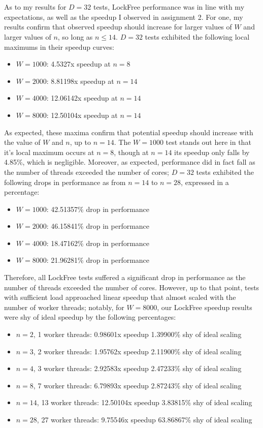 \documentclass[]{article}
\begin{document}
\\\\
As to my results for $D = 32$ tests, LockFree performance was in line with my expectations, as well as the speedup I observed in assignment 2. For one, my results confirm that observed speedup should increase for larger values of $W$ and larger values of $n$, so long as $n \leq 14$. $D = 32$ tests exhibited the following local maximums in their speedup curves:
\begin{itemize}
	\item$W = 1000$: 4.5327x speedup at $n = 8$
	\item$W = 2000$: 8.81198x speedup at $n = 14$
	\item$W = 4000$: 12.06142x speedup at $n = 14$
	\item$W = 8000$: 12.50104x speedup at $n = 14$
\end{itemize}
As expected, these maxima confirm that potential speedup should increase with the value of $W$ and $n$, up to $n = 14$. The $W = 1000$ test stands out here in that it's local maximum occurs at $n = 8$, though at $n = 14$ its speedup only falls by 4.85\%, which is negligible. Moreover, as expected, performance did in fact fall as the number of threads exceeded the number of cores; $D = 32$ tests exhibited the following drops in performance as from $n = 14$ to $n = 28$, expressed in a percentage:
\begin{itemize}
	\item$W = 1000$: 42.51357\% drop in performance
	\item$W = 2000$: 46.15841\% drop in performance
	\item$W = 4000$: 18.47162\% drop in performance
	\item$W = 8000$: 21.96281\% drop in performance
\end{itemize}
Therefore, all LockFree tests suffered a significant drop in performance as the number of threads exceeded the number of cores. However, up to that point, tests with sufficient load approached linear speedup that almost scaled with the number of worker threads; notably, for $W = 8000$, our LockFree speedup results were shy of ideal speedup by the following percentages: 
\begin{itemize}
	\item$n = 2$, 1 worker threads: 0.98601x speedup 1.39900\% shy of ideal scaling
	\item$n = 3$, 2 worker threads: 1.95762x speedup 2.11900\% shy of ideal scaling
	\item$n = 4$, 3 worker threads: 2.92583x speedup 2.47233\% shy of ideal scaling
	\item$n = 8$, 7 worker threads: 6.79893x speedup 2.87243\% shy of ideal scaling
	\item$n = 14$, 13 worker threads: 12.50104x speedup 3.83815\% shy of ideal scaling
	\item$n = 28$, 27 worker threads: 9.75546x speedup 63.86867\% shy of ideal scaling
\end{itemize}
\end{document}
